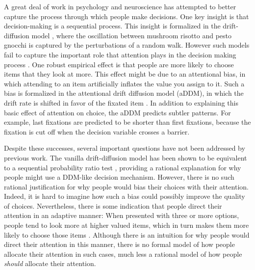 \documentclass[12pt,a4paperpaper,]{article}
\begin{document}
A great deal of work in psychology and neuroscience has attempted to better capture the process through which people make decisions. One key insight is that decision-making is a sequential process. This insight is formalized in the drift-diffusion model \citep{Ratcliff1978,Milosavljevic2010}, where the oscillation between mushroom risotto and pesto gnocchi is captured by the perturbations of a random walk. However such models fail to capture the important role that attention plays in the decision making process \citep{Orquin2013}. One robust empirical effect is that people are more likely to choose items that they look at more. This effect might be due to an attentional bias, in which attending to an item artificially inflates the value you assign to it. Such a bias is formalized in the attentional drift diffusion model (aDDM), in which the drift rate is shifted in favor of the fixated item \citep{Krajbich2010}. In addition to explaining this basic effect of attention on choice, the aDDM predicts subtler patterns. For example, last fixations are predicted to be shorter than first fixations, because the fixation is cut off when the decision variable crosses a barrier.


Despite these successes, several important questions have not been addressed by previous work. The vanilla drift-diffusion model has been shown to be equivalent to a sequential probability ratio test \citep{Bogacz2006,Bitzer2014}, providing a rational explanation for why people might use a DDM-like decision mechanism. However, there is no such rational justification for why people would bias their choices with their attention. Indeed, it is hard to imagine how such a bias could possibly improve the quality of choices. Nevertheless, there is some indication that people direct their attention in an adaptive manner: When presented with three or more options, people tend to look more at higher valued items, which in turn makes them more likely to choose those items \citep{Krajbich2011}. Although there is an intuition for why people would direct their attention in this manner, there is no formal model of how people allocate their attention in such cases, much less a rational model of how people \emph{should} allocate their attention.
\end{document}

